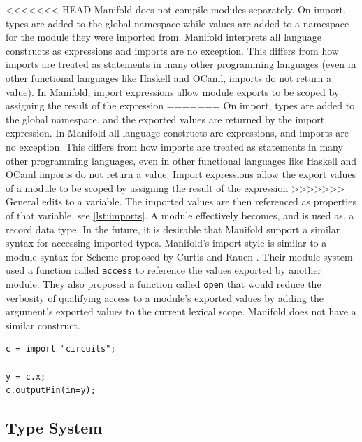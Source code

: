 <<<<<<< HEAD
Manifold does not compile modules separately. On import, types
are added to the global namespace while values are added to a namespace for the
module they were imported from. Manifold interprets all language constructs as
expressions and imports are no exception. This differs from how imports are
treated as statements in many other
programming languages (even in other functional languages like Haskell and
OCaml, imports do not return a value). In Manifold, import expressions allow module
exports to be scoped by assigning the result of the expression
=======
On import, types are added to the global namespace, and the exported values are returned by the import
expression. In Manifold all language constructs are
expressions, and imports are no exception. This differs from how imports are
treated as statements in many other
programming languages, even in other functional languages like Haskell and
OCaml imports do not return a value.  Import expressions allow the
export values of a module to be scoped by assigning the result of the expression
>>>>>>> General edits
to a variable. The imported values are then referenced as properties of that
variable, see \autoref{lst:imports}. A module effectively becomes, and is used as,
a record data type. In the future, it is desirable that Manifold support a
similar syntax for accessing imported types.
Manifold's import style is similar to a module syntax for Scheme proposed by
Curtis and Rauen \cite{Curtis:1990:MSS:91556.91573}. Their module system used
a function called \texttt{access} to reference the values exported by another
module. They also proposed a function called \texttt{open} that would reduce
the verbosity of qualifying access to a module's exported values by adding the
argument's exported values to the current lexical scope. Manifold does not
have a similar construct.

\begin{lstlisting}[label=lst:imports, caption=A module imported into a Manifold file]
c = import "circuits";

y = c.x;
c.outputPin(in=y);
\end{lstlisting}

\subsection{Type System}

